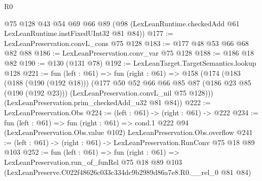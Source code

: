 \begin{lexlean}{R0}
\begin{coremodule}
    @75
    @128
    @43
    @54
    @69
    @66
    @89
    (@98 (LexLeanRuntime.checkedAdd @61 LexLeanRuntime.instFixedUInt32 @81 @84))
@177 := LexLeanPreservation.convL_cons @75 @128
@183 := @177 @48 @53 @66 @68 @82 @88
@186 := LexLeanPreservation.conv_var @75 @128
@188 := @186 @18 @82
@190 := @130 (@131 @78)
@192 := LexLeanTarget.TargetSemantics.lookup @128
@221 := fun (left : @61) =>
  fun (right : @61) =>
  @158
    (@174
      (@183
        (@188 (@190 (@192 @18)))
        (@177
          @50
          @52
          @66
          @66
          @85
          @87
          (@186 @23 @85 (@190 (@192 @23)))
          (LexLeanPreservation.convL_nil @75 @128)))
      (LexLeanPreservation.prim_checkedAdd_u32 @81 @84))
@222 := LexLeanPreservation.Obs
@224 := (left : @61) -> (right : @61) -> @222
@234 := fun (left : @61) =>
  fun (right : @61) =>
  cond.{1} @222 @94 (LexLeanPreservation.Obs.value @102) LexLeanPreservation.Obs.overflow
@241 := (left : @61) -> (right : @61) -> LexLeanPreservation.RunConv @75 @18 @89 @103
@252 := fun (left : @61) =>
  fun (right : @61) =>
  LexLeanPreservation.run_of_funRel
    @75
    @18
    @89
    @103
    (LexLeanPreserve.C022f48626c033c334dc9b2989d86a7e8.R0.__rel_0 @81 @84)
\end{coremodule}
\end{lexlean}
